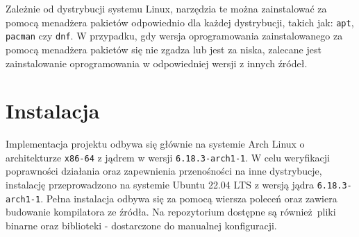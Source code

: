 Zależnie od dystrybucji systemu Linux, narzędzia te można zainstalować za pomocą menadżera pakietów odpowiednio dla każdej dystrybucji, takich jak: \verb|apt|, \verb|pacman| czy \verb|dnf|. W przypadku, gdy wersja oprogramowania zainstalowanego za pomocą menadżera pakietów się nie zgadza lub jest za niska, zalecane jest zainstalowanie oprogramowania w odpowiedniej wersji z innych źródeł.

\section{Instalacja}
\label{ch:04-instalacja}
Implementacja projektu odbywa się głównie na systemie Arch Linux o architekturze \verb|x86-64| z jądrem w wersji \verb|6.18.3-arch1-1|. W celu weryfikacji poprawności działania oraz zapewnienia przenośności na inne dystrybucje, instalację przeprowadzono na systemie Ubuntu 22.04 LTS z wersją jądra \verb|6.18.3-arch1-1|. Pełna instalacja odbywa się za pomocą wiersza poleceń oraz zawiera budowanie kompilatora ze źródła. Na repozytorium dostępne są również pliki binarne oraz biblioteki - dostarczone do manualnej konfiguracji.

